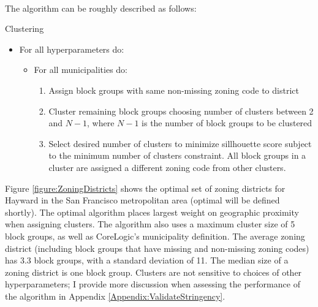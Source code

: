 \documentclass[12pt]{article}
\begin{document}
	\paragraph*{}
	The algorithm can be roughly described as follows: 
	
	\begin{algorithm}
	\caption{Clustering}
			
			\begin{itemize}
				\item[] For all hyperparameters do:
				
				\begin{itemize}
					\item[] For all municipalities do:
					
					\begin{enumerate}
						\item Assign block groups with same non-missing zoning code to district
						
						
						\item Cluster remaining block groups choosing number of clusters between 2 and $N - 1$, where $N - 1$ is the number of block groups to be clustered
						
						\item Select desired number of clusters to minimize sillhouette score subject to the minimum number of clusters constraint. All block groups in a cluster are assigned a different zoning code from other clusters.
					\end{enumerate}
					
				\end{itemize}
			\end{itemize}
	
			
		
 	\end{algorithm}
 	
 	
 	
 	Figure \ref{figure:ZoningDistricts} shows the optimal set of zoning districts for Hayward in the San Francisco metropolitan area (optimal will be defined shortly). The optimal algorithm places largest weight on geographic proximity when assigning clusters. The algorithm also uses a maximum cluster size of 5 block groups, as well as CoreLogic's municipality definition. The average zoning district (including block groups that have missing and non-missing zoning codes) has 3.3 block groups, with a standard deviation of 11. The median size of a zoning district is one block group. Clusters are not sensitive to choices of other hyperparameters; I provide more discussion when assessing the performance of the algorithm in Appendix \ref{Appendix:ValidateStringency}.  
 	
\end{document}
